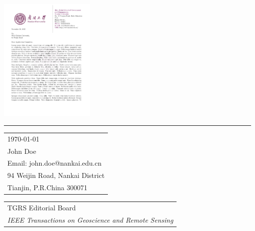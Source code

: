 \documentclass{article}
\begin{document}

\includegraphics[width=0.35\textwidth]{nankai-logo.pdf} %

\vspace{-1em} %

\rule{\linewidth}{1pt} %

\bigskip\bigskip %


\hfill
\begin{tabular}{l @{}}
\hfill \today \bigskip\\ %
\hfill John Doe \\
\hfill Email: john.doe@nankai.edu.cn \\
\hfill 94 Weijin Road, Nankai District\\
\hfill Tianjin, P.R.China 300071 \\ %
\end{tabular}


\bigskip %


% 
% 
\begin{tabular}{@{} l}
	TGRS Editorial Board \\
	\textit{IEEE Transactions on Geoscience and Remote Sensing}
\end{tabular}
\end{document}
